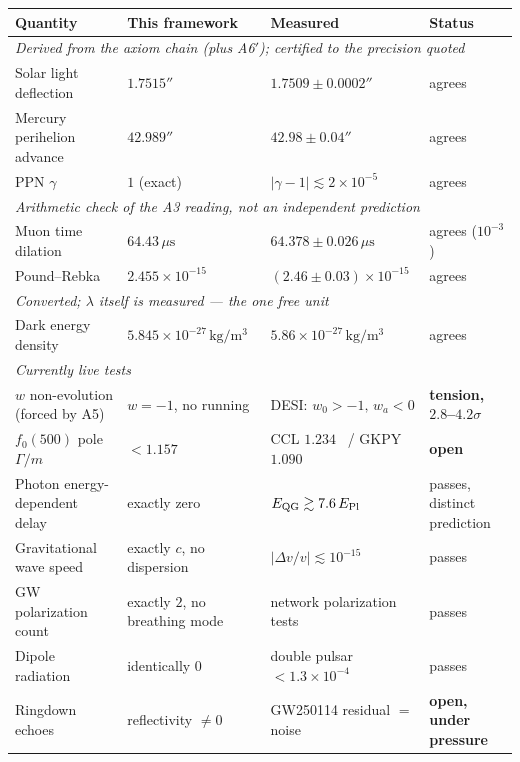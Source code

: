 \documentclass[aps,prd,twocolumn,superscriptaddress,nofootinbib]{revtex4-2}
\begin{document}
\begin{table}
\centering
\small
\begin{tabular}{p{}p{}p{}p{}}
\toprule
Quantity & This framework & Measured & Status \\
\midrule
\multicolumn{4}{l}{\emph{Derived from the axiom chain (plus A6$'$); certified to the precision quoted}}\\
Solar light deflection & $1.7515''$ & $1.7509 \pm 0.0002''$ & agrees \\
Mercury perihelion advance & $42.989''$ & $42.98 \pm 0.04''$ & agrees \\
PPN $\gamma$ & $1$ (exact) & $|\gamma-1| \lesssim 2\times10^{-5}$~\cite{Bertotti2003} & agrees \\
\midrule
\multicolumn{4}{l}{\emph{Arithmetic check of the A3 reading, not an independent prediction}}\\
Muon time dilation & $64.43\,\mu\mathrm{s}$ & $64.378 \pm 0.026\,\mu\mathrm{s}$ & agrees ($10^{-3}$) \\
Pound--Rebka & $2.455\times10^{-15}$ & $(2.46\pm0.03)\times10^{-15}$ & agrees \\
\midrule
\multicolumn{4}{l}{\emph{Converted; $\lambda$ itself is measured — the one free unit}}\\
Dark energy density & $5.845\times10^{-27}\,\mathrm{kg/m^3}$ & $5.86\times10^{-27}\,\mathrm{kg/m^3}$~\cite{Planck2018} & agrees \\
\midrule
\multicolumn{4}{l}{\emph{Currently live tests}}\\
$w$ non-evolution (forced by A5) & $w=-1$, no running & DESI: $w_0>-1,\,w_a<0$ & \textbf{tension, $2.8$--$4.2\sigma$} \\
$f_0(500)$ pole $\Gamma/m$ & $<1.157$ & CCL $1.234$~\cite{CCL2006} / GKPY $1.090$~\cite{GKPY2011} & \textbf{open} \\
Photon energy-dependent delay & exactly zero & $E_{\rm QG}\gtrsim 7.6\,E_{\rm Pl}$ & passes, distinct prediction \\
Gravitational wave speed & exactly $c$, no dispersion & $|\Delta v/v|\lesssim10^{-15}$ & passes \\
GW polarization count & exactly $2$, no breathing mode & network polarization tests & passes \\
Dipole radiation & identically $0$ & double pulsar $<1.3\times10^{-4}$ & passes \\
Ringdown echoes & reflectivity $\neq 0$ & GW250114 residual $=$ noise & \textbf{open, under pressure} \\

\end{tabular}
\end{table}
\end{document}
